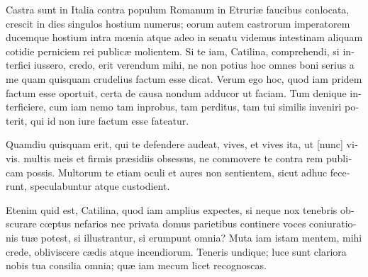 \documentclass[10pt, twoside]{lecturenotes}
\begin{document}
\begin{latin}
Castra sunt in Italia contra populum Romanum in Etruriæ faucibus conlocata, crescit in dies singulos hostium numerus; eorum\marginfig[Duplex pendulæ massæ, $\vq=\tuple{q_1,q_2}\in\R^2$]{\FigureDoublePendulumConfigurationSpace} autem castrorum imperatorem ducemque hostium intra mœnia atque adeo in senatu videmus intestinam aliquam cotidie perniciem rei publicæ molientem. Si te iam, Catilina, comprehendi, si interfici iussero, credo, erit verendum mihi, ne non potius hoc omnes boni serius a me quam quisquam crudelius factum esse dicat. Verum ego hoc, quod iam pridem factum esse oportuit, certa de causa nondum adducor ut faciam. Tum denique interficiere, cum iam nemo tam inprobus, tam perditus, tam tui similis inveniri poterit, qui id non iure factum esse fateatur.

Quamdiu quisquam erit, qui te defendere audeat, vives, et vives ita, ut [nunc] vivis. multis meis et firmis præsidiis obsessus, ne commovere te contra rem publicam possis. Multorum te etiam oculi et aures non sentientem, sicut adhuc fecerunt, speculabuntur atque custodient.

Etenim quid est, Catilina, quod iam amplius expectes, si neque nox tenebris obscurare cœptus nefarios nec privata domus parietibus continere voces coniurationis tuæ potest, si illustrantur, si erumpunt omnia? Muta iam istam mentem, mihi crede, obliviscere cædis atque incendiorum. Teneris undique; luce sunt clariora nobis tua consilia omnia; quæ iam mecum licet recognoscas.

\end{latin}
\end{document}
